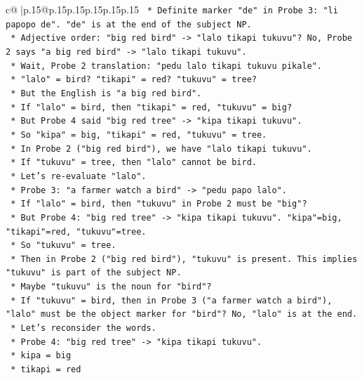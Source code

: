 \documentclass{article}
\begin{document}
{\begin{supertabular}{c@{$\;$}|p{.15\linewidth}@{}p{.15\linewidth}p{.15\linewidth}p{.15\linewidth}p{.15\linewidth}p{.15\linewidth}}
{{{\texttt{    *   Definite marker "de" in Probe 3: "li papopo de". "de" is at the end of the subject NP.} \\
\texttt{    *   Adjective order: "big red bird" {-}> "lalo tikapi tukuvu"? No, Probe 2 says "a big red bird" {-}> "lalo tikapi tukuvu".} \\
\texttt{        *   Wait, Probe 2 translation: "pedu lalo tikapi tukuvu pikale".} \\
\texttt{        *   "lalo" = bird? "tikapi" = red? "tukuvu" = tree?} \\
\texttt{        *   But the English is "a big red bird".} \\
\texttt{        *   If "lalo" = bird, then "tikapi" = red, "tukuvu" = big?} \\
\texttt{        *   But Probe 4 said "big red tree" {-}> "kipa tikapi tukuvu".} \\
\texttt{        *   So "kipa" = big, "tikapi" = red, "tukuvu" = tree.} \\
\texttt{        *   In Probe 2 ("big red bird"), we have "lalo tikapi tukuvu".} \\
\texttt{        *   If "tukuvu" = tree, then "lalo" cannot be bird.} \\
\texttt{        *   Let's re{-}evaluate "lalo".} \\
\texttt{        *   Probe 3: "a farmer watch a bird" {-}> "pedu papo lalo".} \\
\texttt{        *   If "lalo" = bird, then "tukuvu" in Probe 2 must be "big"?} \\
\texttt{        *   But Probe 4: "big red tree" {-}> "kipa tikapi tukuvu". "kipa"=big, "tikapi"=red, "tukuvu"=tree.} \\
\texttt{        *   So "tukuvu" = tree.} \\
\texttt{        *   Then in Probe 2 ("big red bird"), "tukuvu" is present. This implies "tukuvu" is part of the subject NP.} \\
\texttt{        *   Maybe "tukuvu" is the noun for "bird"?} \\
\texttt{        *   If "tukuvu" = bird, then in Probe 3 ("a farmer watch a bird"), "lalo" must be the object marker for "bird"? No, "lalo" is at the end.} \\
\texttt{        *   Let's reconsider the words.} \\
\texttt{        *   Probe 4: "big red tree" {-}> "kipa tikapi tukuvu".} \\
\texttt{            *   kipa = big} \\
\texttt{            *   tikapi = red} \\
}}}
\end{supertabular}}
\end{document}
